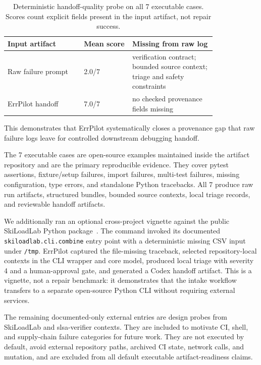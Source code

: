 \documentclass[sigconf]{acmart}
\begin{document}
\begin{table}[t]
  \caption{Deterministic handoff-quality probe on all 7 executable cases. Scores count explicit
  fields present in the input artifact, not repair success.}
  \label{tab:handoff-probe}
  \small
  \begin{tabular}{p{0.30\linewidth}p{0.19\linewidth}p{0.33\linewidth}}
    \toprule
    Input artifact & Mean score & Missing from raw log \\
    \midrule
    Raw failure prompt & 2.0/7 & verification contract; bounded source context;
      triage and safety constraints \\
    ErrPilot handoff & 7.0/7 & no checked provenance fields missing \\
    \bottomrule
  \end{tabular}
\end{table}

This demonstrates that ErrPilot systematically closes a provenance gap that raw
failure logs leave for controlled downstream debugging handoff.

The 7 executable cases are open-source examples maintained inside the artifact
repository and are the primary reproducible evidence. They cover pytest
assertions, fixture/setup failures, import failures, multi-test failures, missing
configuration, type errors, and standalone Python tracebacks. All 7 produce raw
run artifacts, structured bundles, bounded source contexts, local triage records,
and reviewable handoff artifacts.

We additionally ran an optional cross-project vignette against the public
SkiLoadLab Python package~\cite{skiloadlab}. The command invoked its documented
\texttt{skiloadlab.cli.combine} entry point with a deterministic missing CSV
input under \texttt{/tmp}. ErrPilot captured the file-missing traceback,
selected repository-local contexts in the CLI wrapper and core model, produced
local triage with severity 4 and a human-approval gate, and generated a Codex
handoff artifact. This is a vignette, not a repair benchmark: it demonstrates
that the intake workflow transfers to a separate open-source Python CLI without
requiring external services.

The remaining documented-only external entries are design probes from
SkiLoadLab and slsa-verifier contexts. They are included to motivate CI, shell,
and supply-chain failure categories for future work. They are not executed by
default, avoid external repository paths, archived CI state, network calls, and
mutation, and are excluded from all default executable artifact-readiness
claims.
\end{document}
